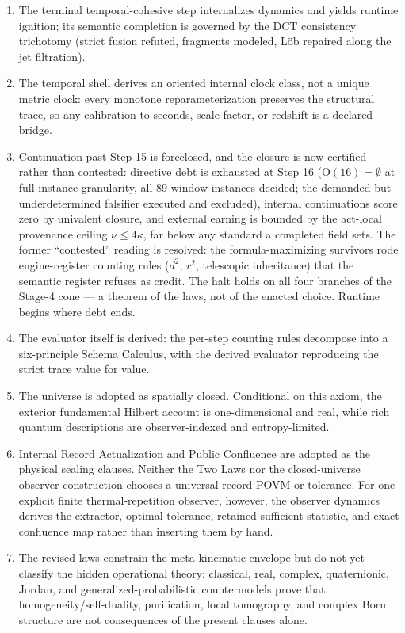\documentclass[11pt]{article}
\theoremstyle{plain}
\theoremstyle{definition}
\theoremstyle{remark}
\begin{document}
\begin{enumerate}[leftmargin=*]
\item The terminal temporal-cohesive step internalizes dynamics and yields runtime ignition; its semantic completion is governed by the DCT consistency trichotomy (strict fusion refuted, fragments modeled, L\"ob repaired along the jet filtration).
\item The temporal shell derives an oriented internal clock class, not a unique metric clock: every monotone reparameterization preserves the structural trace, so any calibration to seconds, scale factor, or redshift is a declared bridge.
\item Continuation past Step 15 is foreclosed, and the closure is now certified rather than contested: directive debt is exhausted at Step 16 (\(\mathrm{O}(16)=\emptyset\) at full instance granularity, all 89 window instances decided; the demanded-but-underdetermined falsifier executed and excluded), internal continuations score zero by univalent closure, and external earning is bounded by the act-local provenance ceiling \(\nu\le4\kappa\), far below any standard a completed field sets. The former ``contested'' reading is resolved: the formula-maximizing survivors rode engine-register counting rules (\(d^2\), \(r^2\), telescopic inheritance) that the semantic register refuses as credit. The halt holds on all four branches of the Stage-4 cone --- a theorem of the laws, not of the enacted choice. Runtime begins where debt ends.
\item The evaluator itself is derived: the per-step counting rules decompose into a six-principle Schema Calculus, with the derived evaluator reproducing the strict trace value for value.
\item The universe is adopted as spatially closed. Conditional on this axiom, the exterior fundamental Hilbert account is one-dimensional and real, while rich quantum descriptions are observer-indexed and entropy-limited.
\item Internal Record Actualization and Public Confluence are adopted as the physical sealing clauses. Neither the Two Laws nor the closed-universe observer construction chooses a universal record POVM or tolerance. For one explicit finite thermal-repetition observer, however, the observer dynamics derives the extractor, optimal tolerance, retained sufficient statistic, and exact confluence map rather than inserting them by hand.
\item The revised laws constrain the meta-kinematic envelope but do not yet classify the hidden operational theory: classical, real, complex, quaternionic, Jordan, and generalized-probabilistic countermodels prove that homogeneity/self-duality, purification, local tomography, and complex Born structure are not consequences of the present clauses alone.

\end{enumerate}
\end{document}
